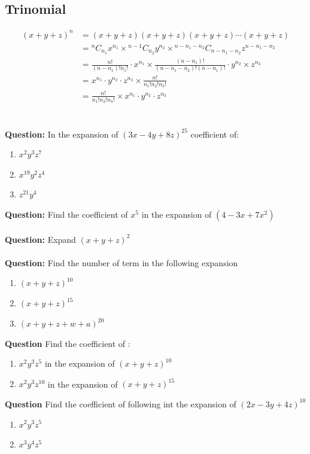 \documentclass[12pt]{article}
\begin{document}
\subsection{Trinomial}
\[
\begin{aligned}
    (x+y+z)^n &= (x+y+z)(x+y+z)(x+y+z)\cdots(x+y+z) \\
    &= {}^{n}C_{n_1}x^{n_1} \times {}^{n-1}C_{n_2}y^{n_2} \times {}^{n-n_1-n_2}C_{n-n_1-n_2}z^{n-n_1-n_2}\\
    &= \frac{n!}{(n-n_1)! n_1!} \cdot x^{n_1} \times \frac{(n-n_1)!}{(n-n_1-n_2)! (n-n_1)!} \cdot y^{n_2} \times z^{n_3} \\
    &= x^{n_1}\cdot y^{n_2} \cdot z^{n_3} \times \frac{n!}{{n_1}!{n_2}!{n_3}!} \\
    &= \frac{n!}{{n_1}!{n_2}!{n_3}!} \times x^{n_1}\cdot y^{n_2} \cdot z^{n_3}
\end{aligned}
\] \\
\\
\textbf{Question: }In the expansion of $(3x-4y+8z)^{25}$ coefficient of:
\begin{enumerate}
    \item $x^2y^3z^7$
    \item $x^{19}y^2z^4$
    \item $z^{21}y^4$
\end{enumerate}
\textbf{Question: }Find the coefficient of $x^5$ in the expansion of $(4-3x+7x^2)$ \\
\\
\textbf{Question: } Expand $(x+y+z)^2$ \\
\\
\textbf{Question: }Find the number of term in the following expansion 
\begin{enumerate}
    \item $(x+y+z)^{10}$
    \item $(x+y+z)^{15}$
    \item $(x+y+z+w+a)^{20}$
\end{enumerate}
\textbf{Question} Find the coefficient of : 
\begin{enumerate}
    \item $x^2y^3z^5$ in the expansion of $(x+y+z)^{10}$
    \item $x^2y^3z^{10}$ in the expansion of $(x+y+z)^{15}$
\end{enumerate}
\textbf{Question} Find the coefficient of following int the expansion of $(2x-3y+4z)^{10}$
\begin{enumerate}
    \item $x^2y^3z^5$
    \item $x^3y^4z^5$
\end{enumerate}
\end{document}
